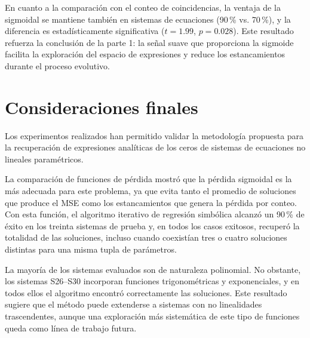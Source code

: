 En cuanto a la comparación con el conteo de coincidencias, la ventaja de la sigmoidal se mantiene también en sistemas de ecuaciones (90\,\% vs. 70\,\%), y la diferencia es estadísticamente significativa (\(t = 1.99\), \(p = 0.028\)). Este resultado refuerza la conclusión de la parte 1: la señal suave que proporciona la sigmoide facilita la exploración del espacio de expresiones y reduce los estancamientos durante el proceso evolutivo.

\section{Consideraciones finales} \label{sec:conclusiones_capitulo}

Los experimentos realizados han permitido validar la metodología propuesta para la recuperación de expresiones analíticas de los ceros de sistemas de ecuaciones no lineales paramétricos.

La comparación de funciones de pérdida mostró que la pérdida sigmoidal es la más adecuada para este problema, ya que evita tanto el promedio de soluciones que produce el MSE como los estancamientos que genera la pérdida por conteo. Con esta función, el algoritmo iterativo de regresión simbólica alcanzó un 90\,\% de éxito en los treinta sistemas de prueba y, en todos los casos exitosos, recuperó la totalidad de las soluciones, incluso cuando coexistían tres o cuatro soluciones distintas para una misma tupla de parámetros.

La mayoría de los sistemas evaluados son de naturaleza polinomial. No obstante, los sistemas S26--S30 incorporan funciones trigonométricas y exponenciales, y en todos ellos el algoritmo encontró correctamente las soluciones. Este resultado sugiere que el método puede extenderse a sistemas con no linealidades trascendentes, aunque una exploración más sistemática de este tipo de funciones queda como línea de trabajo futura.
